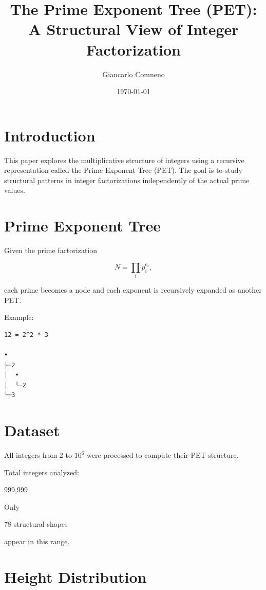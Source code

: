\documentclass[11pt]{article}
\title{The Prime Exponent Tree (PET): \\
A Structural View of Integer Factorization}
\author{Giancarlo Comneno}
\date{\today}
\begin{document}
\maketitle

\section{Introduction}

This paper explores the multiplicative structure of integers using a recursive
representation called the Prime Exponent Tree (PET). The goal is to study
structural patterns in integer factorizations independently of the actual
prime values.

\section{Prime Exponent Tree}

Given the prime factorization

\begin{equation}
N = \prod_i p_i^{e_i},
\end{equation}

each prime becomes a node and each exponent is recursively expanded
as another PET.

Example:

\begin{verbatim}
12 = 2^2 * 3

•
├─2
│  •
│  └─2
└─3
\end{verbatim}

\section{Dataset}

All integers from 2 to $10^6$ were processed to compute their PET structure.

Total integers analyzed:

\begin{center}
999,999
\end{center}

Only

\begin{center}
78 structural shapes
\end{center}

appear in this range.

\section{Height Distribution}
\end{document}
